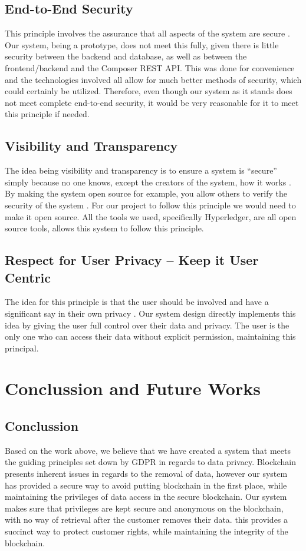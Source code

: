 \documentclass[11pt,journal]{IEEEtran}
\begin{document}
\subsection{End-to-End Security}
This principle involves the assurance that all aspects of the system are secure \cite{cavoukian2010privacy}. Our system, being a prototype, does not meet this fully, given there is little security between the backend and database, as well as between the frontend/backend and the Composer REST API. This was done for convenience and the technologies involved all allow for much better methods of security, which could certainly be utilized. Therefore, even though our system as it stands does not meet complete end-to-end security, it would be very reasonable for it to meet this principle if needed. 

\subsection{Visibility and Transparency}
The idea being visibility and transparency is to ensure a system is “secure” simply because no one knows, except the creators of the system, how it works \cite{cavoukian2010privacy}. By making the system open source for example, you allow others to verify the security of the system \cite{cavoukian2010privacy}. For our project to follow this principle we would need to make it open source. All the tools we used, specifically Hyperledger, are all open source tools, allows this system to follow this principle.

\subsection{Respect for User Privacy -- Keep it User Centric}
The idea for this principle is that the user should be involved and have a significant say in their own privacy \cite{cavoukian2010privacy}. Our system design directly implements this idea by giving the user full control over their data and privacy. The user is the only one who can access their data without explicit permission, maintaining this principal.

\section{Conclussion and Future Works} \label{sec:conclussion}

\subsection{Conclussion} 
Based on the work above, we believe that we have created a system that meets the guiding principles set down by GDPR in regards to data privacy. Blockchain presents inherent issues in regards to the removal of data, however our system has provided a secure way to avoid putting blockchain in the first place, while maintaining the privileges of data access in the secure blockchain. Our system makes sure that privileges are kept secure and anonymous on the blockchain, with no way of retrieval after the customer removes their data. this provides a succinct way to protect customer rights, while maintaining the integrity of the blockchain.
\end{document}
